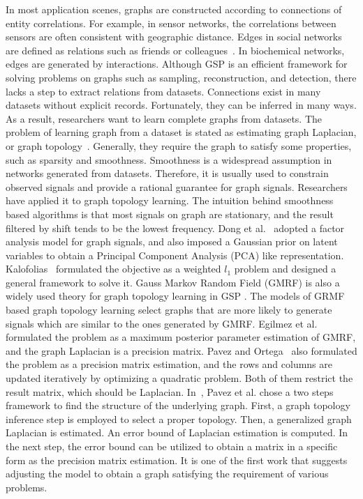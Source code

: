 In most application scenes, graphs are constructed according to connections of entity correlations. For example, in sensor networks, the correlations between sensors are often consistent with geographic distance. Edges in social networks are defined as relations such as friends or colleagues~. In biochemical networks, edges are generated by interactions. Although GSP is an efficient framework for solving problems on graphs such as sampling, reconstruction, and detection, there lacks a step to extract relations from datasets. Connections exist in many datasets without explicit records. Fortunately, they can be inferred in many ways.
As a result, researchers want to learn complete graphs from datasets. The problem of learning graph from a dataset is stated as estimating graph Laplacian, or graph topology~. Generally, they require the graph to satisfy some properties, such as sparsity and smoothness. Smoothness is a widespread assumption in networks generated from datasets. Therefore, it is usually used to constrain observed signals and provide a rational guarantee for graph signals. Researchers have applied it to graph topology learning. The intuition behind smoothness based algorithms is that most signals on graph are stationary, and the result filtered by shift tends to be the lowest frequency. Dong et al.~ adopted a factor analysis model for graph signals, and also imposed a Gaussian prior on latent variables to obtain a Principal Component Analysis (PCA) like representation. Kalofolias~ formulated the objective as a weighted \(l_1\) problem and designed a general framework to solve it.
Gauss Markov Random Field (GMRF) is also a widely used theory for graph topology learning in GSP . The models of GRMF based graph topology learning select graphs that are more likely to generate signals which are similar to the ones generated by GMRF. Egilmez et al.~ formulated the problem as a maximum posterior parameter estimation of GMRF, and the graph Laplacian is a precision matrix. Pavez and Ortega~ also formulated the problem as a precision matrix estimation, and the rows and columns are updated iteratively by optimizing a quadratic problem. Both of them restrict the result matrix, which should be Laplacian. In~, Pavez et al. chose a two steps framework to find the structure of the underlying graph. First, a graph topology inference step is employed to select a proper topology. Then, a generalized graph Laplacian is estimated. An error bound of Laplacian estimation is computed. In the next step, the error bound can be utilized to obtain a matrix in a specific form as the precision matrix estimation. It is one of the first work that suggests adjusting the model to obtain a graph satisfying the requirement of various problems.
